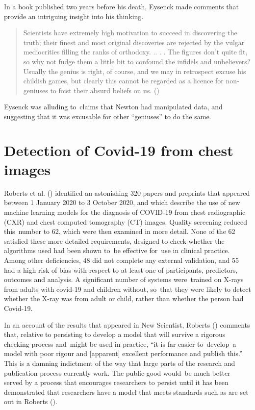 \documentclass[
  10ptls,
  b5paper]{book}
\begin{document}
In a book published two years before his death, Eysenck made
comments that provide an intriguing insight into his thinking.

\begin{quote}
Scientists have extremely high motivation to succeed in discovering the truth; their finest and most original discoveries are rejected by the vulgar mediocrities filling the ranks of orthodoxy. .. . . The figures don't quite fit, so why not fudge them a little bit to confound the infidels and unbelievers? Usually the genius is right, of course, and we may in retrospect excuse his childish games, but clearly this cannot be regarded as a licence for non-geniuses to foist their absurd beliefs on us. ()
\end{quote}

Eysenck was alluding to~claims that Newton had manipulated data, and
suggesting that it was excusable for other ``geniuses'' to do the same.

\section{Detection of Covid-19 from chest images}\label{detection-of-covid-19-from-chest-images}

Roberts et al. () identified an astonishing 320 papers and preprints
that appeared between 1 January 2020 to 3 October 2020, and which
describe the use of new machine learning models for the diagnosis of
COVID-19 from chest radiographic (CXR) and chest computed tomography
(CT) images. Quality screening reduced this~number to 62, which were
then examined in more detail. None of the 62 satisfied these more
detailed requirements, designed to check whether the algorithms used
had been shown to~be effective for~use in clinical practice. Among
other deficiencies, 48 did not complete any external validation, and
55 had a high risk of bias with respect to at least one of
participants, predictors, outcomes and analysis. A significant number
of systems were~trained on X-rays from adults with covid-19 and
children without, so~that they were likely to detect whether the
X-ray was from adult or child, rather than whether the person had
Covid-19.

In an account of the results that appeared in New Scientist,
Roberts () comments that, relative to persisting to
develop a model that will survive a rigorous
checking process and~might be used in practice, ``it is far easier
to~develop~a model with poor rigour and {[}apparent{]} excellent
performance and publish this.'' This is a damning indictment of
the way that large parts of the research and publication process
currently work. The public good would~be much better served
by a process that encourages researchers to persist until it
has been demonstrated that researchers have a model that meets
standards such as are set out in Roberts ().
\end{document}
